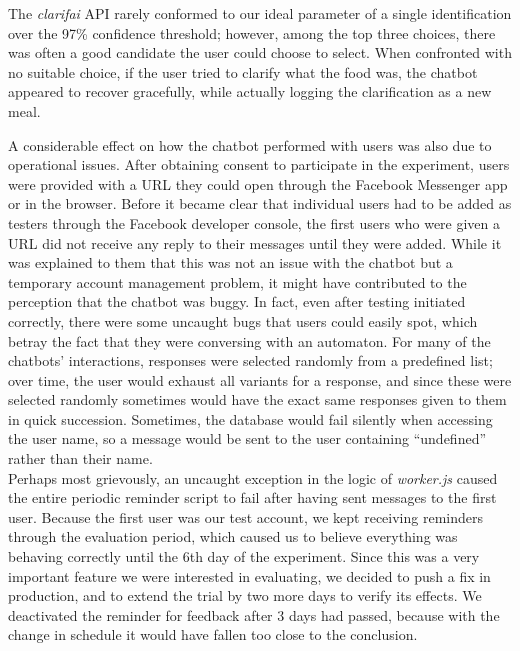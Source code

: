 The \textit{clarifai} API rarely conformed to our ideal parameter of a single identification over the 97\% confidence threshold; however, among the top three choices, there was often a good candidate the user could choose to select. When confronted with no suitable choice, if the user tried to clarify what the food was, the chatbot appeared to recover gracefully, while actually logging the clarification as a new meal. 

A considerable effect on how the chatbot performed with users was also due to operational issues. After obtaining consent to participate in the experiment, users were provided with a URL they could open through the Facebook Messenger app or in the browser. Before it became clear that individual users had to be added as testers through the Facebook developer console, the first users who were given a URL did not receive any reply to their messages until they were added. While it was explained to them that this was not an issue with the chatbot but a temporary account management problem, it might have contributed to the perception that the chatbot was buggy. In fact, even after testing initiated correctly, there were some uncaught bugs that users could easily spot, which betray the fact that they were conversing with an automaton. For many of the chatbots' interactions, responses were selected randomly from a predefined list; over time, the user would exhaust all variants for a response, and since these were selected randomly sometimes would have the exact same responses given to them in quick succession. Sometimes, the database would fail silently when accessing the user name, so a message would be sent to the user containing ``undefined'' rather than their name. \\
Perhaps most grievously, an uncaught exception in the logic of \textit{worker.js} caused the entire periodic reminder script to fail after having sent messages to the first user. Because the first user was our test account, we kept receiving reminders through the evaluation period, which caused us to believe everything was behaving correctly until the 6th day of the experiment. Since this was a very important feature we were interested in evaluating, we decided to push a fix in production, and to extend the trial by two more days to verify its effects. We deactivated the reminder for feedback after 3 days had passed, because with the change in schedule it would have fallen too close to the conclusion. \\
